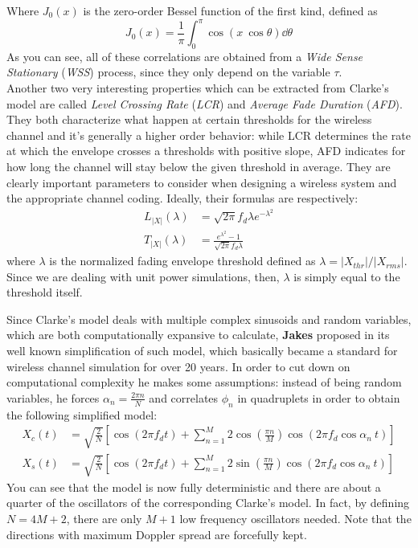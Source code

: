 %
Where $J_0(x)$ is the zero-order Bessel function of the first kind, defined as%
%
\begin{equation}
J_0(x) = \frac{1}{\pi} \int_0^\pi \cos( x \ \cos\theta) \dd{\theta}
\end{equation}%
%
As you can see, all of these correlations are obtained from a \textit{Wide Sense Stationary} (\textit{WSS}) process, since they only depend on the variable $\tau$.\\
Another two very interesting properties which can be extracted from Clarke's model are called \textit{Level Crossing Rate} (\textit{LCR}) and \textit{Average Fade Duration} (\textit{AFD}). They both characterize what happen at certain thresholds for the wireless channel and it's generally a higher order behavior: while LCR determines the rate at which the envelope crosses a thresholds with positive slope, AFD indicates for how long the channel will stay below the given threshold in average. They are clearly important parameters to consider when designing a wireless system and the appropriate channel coding. Ideally, their formulas are respectively:%
%
\begin{align}
L_{|X|}(\lambda) &= \sqrt{2\pi} f_d \lambda e^{-\lambda^2} \label{eq:LCR} \\
T_{|X|}(\lambda) &= \frac{e^{\lambda^2} - 1}{\sqrt{2\pi} f_d \lambda} \label{eq:AFD}
\end{align}%
%
where $\lambda$ is the normalized fading envelope threshold defined as $\lambda = |X_{thr}|/|X_{rms}|$. Since we are dealing with unit power simulations, then, $\lambda$ is simply equal to the threshold itself.

Since Clarke's model deals with multiple complex sinusoids and random variables, which are both computationally expansive to calculate, \textbf{Jakes} proposed in \cite{jakes} its well known simplification of such model, which basically became a standard for wireless channel simulation for over 20 years. In order to cut down on computational complexity he makes some assumptions: instead of being random variables, he forces $\alpha_n = \frac{2\pi n}{N}$ and correlates $\phi_n$ in quadruplets in order to obtain the following simplified model:%
%
\begin{subequations}
\begin{align}\label{eq:jakes_xc}
X_c(t) &= \sqrt{\frac{2}{N}} \left[ \cos(2\pi f_d t) + \sum_{n=1}^{M} 2\cos \left( \frac{\pi n}{M} \right) \cos( 2\pi f_d \cos \alpha_n \ t) \right]\\
\label{eq:jakes_xs}
X_s(t) &= \sqrt{\frac{2}{N}} \left[ \cos(2\pi f_d t) + \sum_{n=1}^{M} 2\sin \left( \frac{\pi n}{M} \right) \cos( 2\pi f_d \cos \alpha_n \ t) \right]
\end{align}
\end{subequations}%
%
You can see that the model is now fully deterministic and there are about a quarter of the oscillators of the corresponding Clarke's model. In fact, by defining $N = 4M+2$, there are only $M+1$ low frequency oscillators needed. Note that the directions with maximum Doppler spread are forcefully kept.

